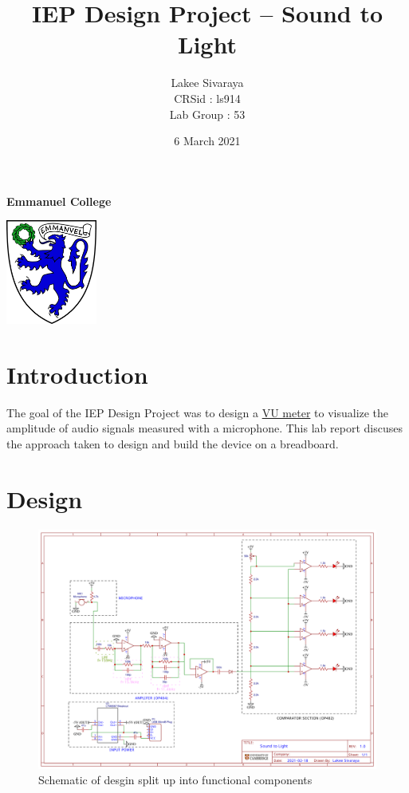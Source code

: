 \documentclass[10pt]{article}
\title{\textbf{\fontsize{26}{12}\selectfont IEP Design Project – Sound to Light}}
\author{{\LARGE Lakee Sivaraya}\\[0.2in] CRSid : ls914\\[0.1in] Lab Group : 53}
\date{6 March 2021}
\begin{document}
\begin{titlepage}
\maketitle
    \centering
    \vfill
    {\bfseries\Large
     Emmanuel College\vspace{0.4in}
    }    
    
    \includegraphics[width=3cm]{Emmanuel.pdf} 
    \vfill
    \vfill
    \thispagestyle{empty}

\end{titlepage}

\newpage
\section{Introduction}

The goal of the IEP Design Project was to design a \href{https://en.wikipedia.org/wiki/VU_meter}{VU meter} to visualize the amplitude of audio signals measured with a microphone. 
This lab report discuses the approach taken to design and build the device on a breadboard.

\section{Design}
    
    \begin{figure}[h]
        \begin{center}
        \includegraphics[width=\linewidth, height = 0.5\textheight, keepaspectratio]{schem.pdf} 
        \caption{Schematic of desgin split up into functional components}
        \label{fig:schem}      
        \end{center}
    \end{figure}
    
\end{document}
